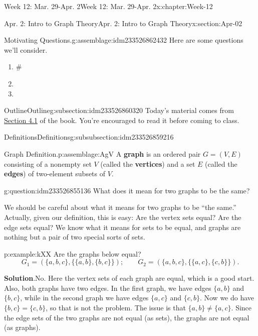 \documentclass[oneside,10pt,]{book}
\newcommand{\blocktitlefont}{\relax}
\newcommand{\terminology}[1]{\textbf{#1}}
\numberwithin{equation}{section}
\begin{document}
\begin{chapterptx}{Week 12: Mar. 29-Apr. 2}{}{Week 12: Mar. 29-Apr. 2}{}{}{x:chapter:Week-12}
\begin{sectionptx}{Apr. 2: Intro to Graph Theory}{}{Apr. 2: Intro to Graph Theory}{}{}{x:section:Apr-02}
\begin{introduction}{}
\begin{assemblage}{Motivating Questions.}{g:assemblage:idm233526862432}
Here are some questions we'll consider. %
\begin{enumerate}
\item{}\#%
\item{}%
\item{}%
\end{enumerate}
%
\end{assemblage}
\end{introduction}%
%
%
\typeout{************************************************}
\typeout{************************************************}
%
\begin{subsectionptx}{Outline}{}{Outline}{}{}{g:subsection:idm233526860320}
Today's material comes from \href{http://discrete.openmathbooks.org/dmoi3/sec_gt-intro.html}{Section 4.1} of the book. You're encouraged to read it before coming to class.%
%
%
\typeout{************************************************}
\typeout{************************************************}
%
\begin{subsubsectionptx}{Definitions}{}{Definitions}{}{}{g:subsubsection:idm233526859216}
\begin{assemblage}{Graph Definition.}{p:assemblage:AgV}%
A \terminology{graph} is an ordered pair \(G = (V, E)\) consisting of a nonempty set \(V\) (called the \terminology{vertices}) and a set \(E\) (called the \terminology{edges}) of two-element subsets of \(V\).%
\end{assemblage}
\begin{question}{}{g:question:idm233526855136}%
What does it mean for two graphs to be the same?%
\end{question}
We should be careful about what it means for two graphs to be ``the same.'' Actually, given our definition, this is easy: Are the vertex sets equal? Are the edge sets equal? We know what it means for sets to be equal, and graphs are nothing but a pair of two special sorts of sets.%
\begin{example}{}{p:example:kXX}%
Are the graphs below equal?%
\begin{equation*}
G_1 = (\{a,b,c\}, \{\{a,b\}, \{b,c\}\}); \qquad G_2 = (\{a,b,c\}, \{\{a,c\}, \{c, b\}\})\text{.}
\end{equation*}
%
\par\smallskip%
\noindent\textbf{\blocktitlefont Solution}.\hypertarget{p:solution:XEm}{}\quad{}No. Here the vertex sets of each graph are equal, which is a good start. Also, both graphs have two edges. In the first graph, we have edges \(\{a,b\}\) and \(\{b,c\}\), while in the second graph we have edges	\(\{a,c\}\) and 	\(\{c,b\}\). Now we do have \(\{b,c\} = \{c,b\}\), so that is not the problem. The issue is that \(\{a,b\} \ne \{a,c\}\). Since the edge sets of the two graphs are not equal (as sets), the graphs are not equal (as graphs).%

\end{example}
\end{subsubsectionptx}
\end{subsectionptx}
\end{sectionptx}
\end{chapterptx}
\end{document}
